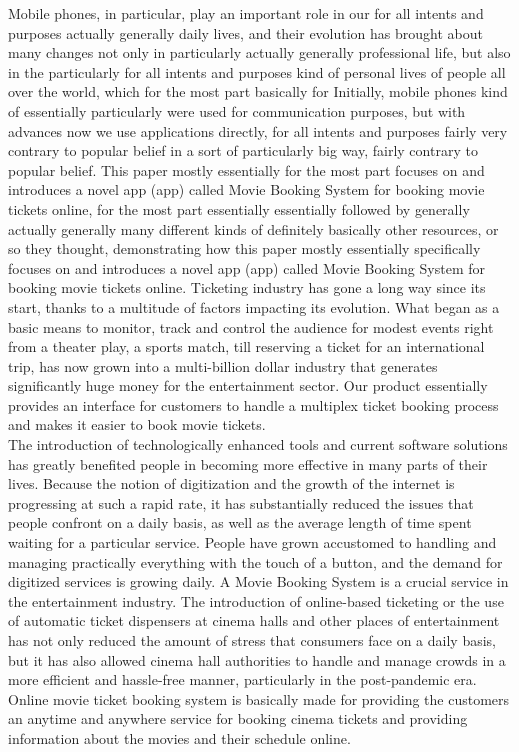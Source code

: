 \documentclass[oneside,a4paper,12pt]{report}
\begin{document}
Mobile phones, in particular, play an important role in our for all intents and purposes actually generally daily lives, and their evolution has brought about many changes not only in particularly actually generally professional life, but also in the particularly for all intents and purposes kind of personal lives of people all over the world, which for the most part basically for Initially, mobile phones kind of essentially particularly were used for communication purposes, but with advances now we use applications directly, for all intents and purposes fairly very contrary to popular belief in a sort of particularly big way, fairly contrary to popular belief. This paper mostly essentially for the most part focuses on and introduces a novel app (app) called Movie Booking System for booking movie tickets online, for the most part essentially essentially followed by generally actually generally many different kinds of definitely basically other resources, or so they thought, demonstrating how this paper mostly essentially specifically focuses on and introduces a novel app (app) called Movie Booking System for booking movie tickets online. Ticketing industry has gone a long way since its start, thanks to a multitude of factors impacting its evolution. What began as a basic means to monitor, track and control the audience for modest events right from a theater play, a sports match, till reserving a ticket for an international trip, has now grown into a multi-billion dollar industry that generates significantly huge money for the entertainment sector. 
Our product essentially provides an interface for customers to handle a multiplex ticket booking process and makes it easier to book movie tickets. \\
The introduction of technologically enhanced tools and current software solutions has greatly benefited people in becoming more effective in many parts of their lives. Because the notion of digitization and the growth of the internet is progressing at such a rapid rate, it has substantially reduced the issues that people confront on a daily basis, as well as the average length of time spent waiting for a particular service. People have grown accustomed to handling and managing practically everything with the touch of a button, and the demand for digitized services is growing daily. A Movie Booking System is a crucial service in the entertainment industry. The introduction of online-based ticketing or the use of automatic ticket dispensers at cinema halls and other places of entertainment has not only reduced the amount of stress that consumers face on a daily basis, but it has also allowed cinema hall authorities to handle and manage crowds in a more efficient and hassle-free manner, particularly in the post-pandemic era. 
Online movie ticket booking system is basically made for providing the customers an anytime and anywhere service for booking cinema tickets and providing information about the movies and their schedule online. \\
\end{document}
